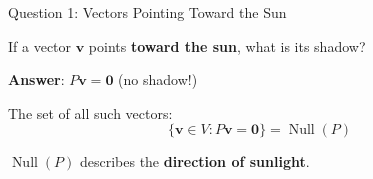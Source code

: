 \documentclass[10pt]{beamer}
\theoremstyle{definition}
\newcommand{\x}[1]{\alert{\textbf{#1}}}
\begin{document}
\begin{frame}{Question 1: Vectors Pointing Toward the Sun}

If a vector $\mathbf{v}$ points \x{toward the sun}, what is its shadow?

\begin{center}
\end{center}

\vspace{0.5em}

\x{Answer}: $P\mathbf{v} = \mathbf{0}$ (no shadow!)

\vspace{0.5em}

The set of all such vectors:
$$\{\mathbf{v} \in V : P\mathbf{v} = \mathbf{0}\} = \operatorname{Null}(P)$$

\vspace{0.5em}

$\operatorname{Null}(P)$ describes the \x{direction of sunlight}.

\end{frame}
\end{document}
